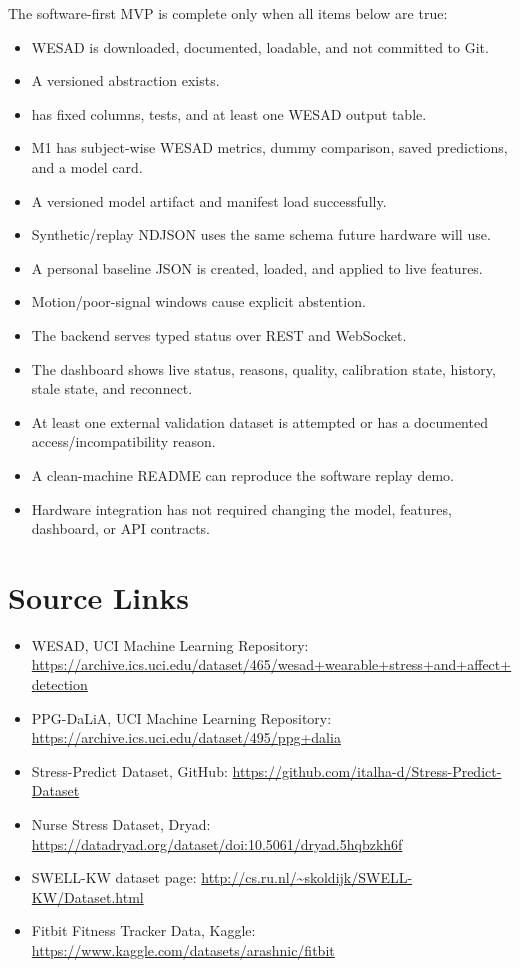 \documentclass[11pt,a4paper]{article}
\newcommand{\code}{\path}
\begin{document}
\begin{donebox}
The software-first MVP is complete only when all items below are true:
\begin{itemize}
\item WESAD is downloaded, documented, loadable, and not committed to Git.
\item A versioned \code{SignalBundle} abstraction exists.
\item \code{features-v1} has fixed columns, tests, and at least one WESAD output table.
\item M1 has subject-wise WESAD metrics, dummy comparison, saved predictions, and a model card.
\item A versioned model artifact and manifest load successfully.
\item Synthetic/replay NDJSON uses the same schema future hardware will use.
\item A personal baseline JSON is created, loaded, and applied to live features.
\item Motion/poor-signal windows cause explicit abstention.
\item The backend serves typed status over REST and WebSocket.
\item The dashboard shows live status, reasons, quality, calibration state, history, stale state, and reconnect.
\item At least one external validation dataset is attempted or has a documented access/incompatibility reason.
\item A clean-machine README can reproduce the software replay demo.
\item Hardware integration has not required changing the model, features, dashboard, or API contracts.
\end{itemize}
\end{donebox}

\section{Source Links}

\begin{itemize}
\item WESAD, UCI Machine Learning Repository:
\url{https://archive.ics.uci.edu/dataset/465/wesad+wearable+stress+and+affect+detection}
\item PPG-DaLiA, UCI Machine Learning Repository:
\url{https://archive.ics.uci.edu/dataset/495/ppg+dalia}
\item Stress-Predict Dataset, GitHub:
\url{https://github.com/italha-d/Stress-Predict-Dataset}
\item Nurse Stress Dataset, Dryad:
\url{https://datadryad.org/dataset/doi:10.5061/dryad.5hqbzkh6f}
\item SWELL-KW dataset page:
\url{http://cs.ru.nl/~skoldijk/SWELL-KW/Dataset.html}
\item Fitbit Fitness Tracker Data, Kaggle:
\url{https://www.kaggle.com/datasets/arashnic/fitbit}
\end{itemize}
\end{document}
